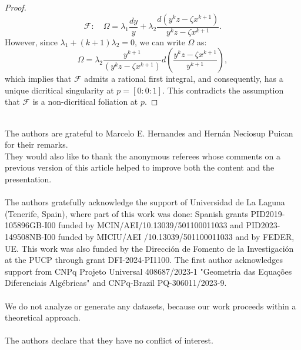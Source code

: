 \documentclass[11pt]{amsart}
\newcommand{\F}{\mathcal{F}}
\begin{document}
\begin{proof}
\[
\mathcal{F}:\quad\Omega = \lambda_1 \frac{dy}{y} + \lambda_2 \frac{d(y^{k}z - \zeta x^{k+1})}{y^{k}z - \zeta x^{k+1}}.
\]
However, since $\lambda_1 + (k+1)\lambda_2 = 0$, we can write $\Omega$ as:
\[
\Omega = \lambda_2 \frac{y^{k+1}}{(y^{k}z - \zeta x^{k+1})} d\left( \frac{y^{k}z - \zeta x^{k+1}}{y^{k+1}} \right),
\]
which implies that $\mathcal{F}$ admits a rational first integral, and consequently, has a unique dicritical singularity at $p = [0:0:1]$. This contradicts the assumption that $\F$ is a non-dicritical foliation at $p$.
\end{proof}


\\
The authors are grateful to Marcelo E. Hernandes and Hern\'an Neciosup Puican for their remarks.\\
They would also like to thank the anonymous referees whose comments on a previous version of this article helped to improve both the content and the presentation.\\


\\
The authors gratefully acknowledge the support of Universidad de La Laguna (Tenerife, Spain), where part of this work was done: Spanish grants PID2019-105896GB-I00 funded by MCIN/AEI/10.13039/501100011033 and PID2023-149508NB-I00 funded by 
MICIU/AEI
/10.13039/501100011033 and by
FEDER, UE. This work was  also funded by the Direcci\'on de Fomento de la Investigaci\'on at the PUCP through grant DFI-2024-PI1100. 
The first author acknowledges support from CNPq Projeto Universal 408687/2023-1 "Geometria das Equa\c{c}\~oes Diferenciais Alg\'ebricas" and CNPq-Brazil PQ-306011/2023-9.\\

\\
We do not analyze or generate any datasets, because our work proceeds within a theoretical approach.\\


\\
The authors declare that they have no conflict of interest.
\end{document}
